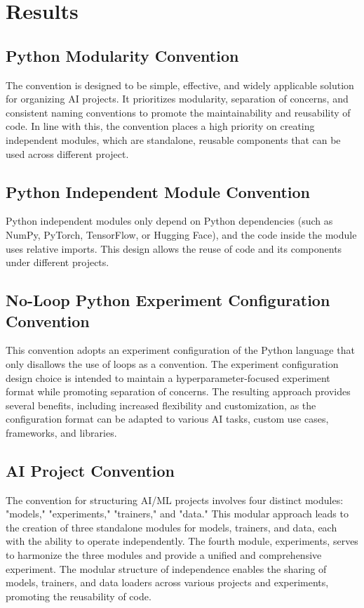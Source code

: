 
\section{Results}


\subsection{Python Modularity Convention}
The convention is designed to be simple, effective, and widely applicable solution for organizing AI projects. It prioritizes modularity, separation of concerns, and consistent naming conventions to promote the maintainability and reusability of code. In line with this, the convention places a high priority on creating independent modules, which are standalone, reusable components that can be used across different project.

\subsection{Python Independent Module Convention}
Python independent modules only depend on Python dependencies (such as NumPy, PyTorch, TensorFlow, or Hugging Face), and the code inside the module uses relative imports. This design allows the reuse of code and its components under different projects. 



\subsection{No-Loop Python Experiment Configuration Convention}

This convention adopts an experiment configuration of the Python language that only disallows the use of loops as a convention. The experiment configuration design choice is intended to maintain a hyperparameter-focused experiment format while promoting separation of concerns. The resulting approach provides several benefits, including increased flexibility and customization, as the configuration format can be adapted to various AI tasks, custom use cases, frameworks, and libraries. 



\subsection{AI Project Convention}
The convention for structuring AI/ML projects involves four distinct modules: "models," "experiments," "trainers," and "data." This modular approach leads to the creation of three standalone modules for models, trainers, and data, each with the ability to operate independently. The fourth module, experiments, serves to harmonize the three modules and provide a unified and comprehensive experiment. The modular structure of independence enables the sharing of models, trainers, and data loaders across various projects and experiments, promoting the reusability of code.




